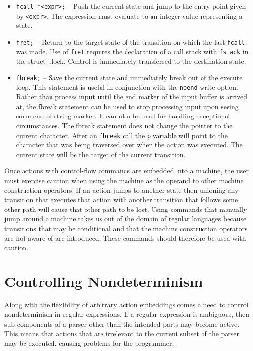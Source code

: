 \documentclass[letterpaper,11pt,oneside]{book}
\begin{document}
\begin{itemize}
\item \verb|fcall *<expr>;| -- Push the current state and jump to the entry
point given by \verb|<expr>|. The expression must evaluate to an integer value
representing a state.

\item \verb|fret;| -- Return to the target state of the transition on which the
last \verb|fcall| was made.  Use of \verb|fret| requires the declaration of a
call stack with \verb|fstack| in the struct block.  Control is immediately
transferred to the destination state.

\item \verb|fbreak;| -- Save the current state and immediately break out of the
execute loop. This statement is useful in conjunction with the \verb|noend|
write option. Rather than process input until the end marker of the input
buffer is arrived at, the fbreak statement can be used to stop processing input
upon seeing some end-of-string marker.  It can also be used for handling
exceptional circumstances.  The fbreak statement does not change the pointer to
the current character. After an \verb|fbreak| call the \verb|p| variable will point to
the character that was being traversed over when the action was
executed. The current state will be the target of the current transition.

\end{itemize}

 Once actions with control-flow commands are embedded into a
machine, the user must exercise caution when using the machine as the operand
to other machine construction operators. If an action jumps to another state
then unioning any transition that executes that action with another transition
that follows some other path will cause that other path to be lost. Using
commands that manually jump around a machine takes us out of the domain of
regular languages because transitions that may be conditional and that the
machine construction operators are not aware of are introduced.  These
commands should therefore be used with caution.


\chapter{Controlling Nondeterminism}
\label{controlling-nondeterminism}

Along with the flexibility of arbitrary action embeddings comes a need to
control nondeterminism in regular expressions. If a regular expression is
ambiguous, then sub-components of a parser other than the intended parts may become
active. This means that actions that are irrelevant to the
current subset of the parser may be executed, causing problems for the
programmer.
\end{document}
